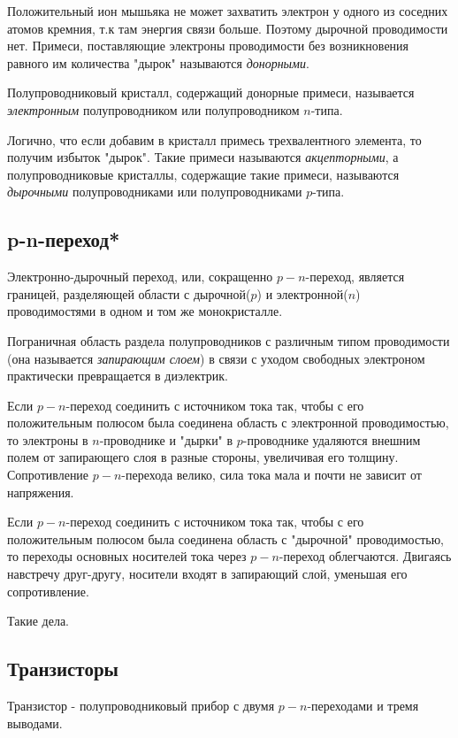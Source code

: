 \documentclass[12pt, a4paper]{article}
\begin{document}
Положительный ион мышьяка не может захватить электрон у одного из соседних атомов кремния, т.к там энергия связи больше. Поэтому дырочной проводимости нет. Примеси, поставляющие электроны проводимости без возникновения равного им количества "дырок" называются \textit{донорными}.

Полупроводниковый кристалл, содержащий донорные примеси, называется \textit{электронным} полупроводником или полупроводником $n$-типа.

Логично, что если добавим в кристалл примесь трехвалентного элемента, то получим избыток "дырок". Такие примеси называются \textit{акцепторными}, а полупроводниковые кристаллы, содержащие такие примеси, называются \textit{дырочными} полупроводниками или полупроводниками $p$-типа.

\subsection{p-n-переход*}
Электронно-дырочный переход, или, сокращенно $p-n$-переход, является границей, разделяющей области с дырочной($p$) и электронной($n$) проводимостями в одном и том же монокристалле.

Пограничная область раздела полупроводников с различным типом проводимости (она называется \textit{запирающим слоем}) в связи с уходом свободных электроном практически превращается в диэлектрик.

Если $p-n$-переход соединить с источником тока так, чтобы с его положительным полюсом была соединена область с электронной проводимостью, то электроны в $n$-проводнике и "дырки" в $p$-проводнике удаляются внешним полем от запирающего слоя в разные стороны, увеличивая его толщину. Сопротивление $p-n$-перехода велико, сила тока мала и почти не зависит от напряжения.

Если $p-n$-переход соединить с источником тока так, чтобы с его положительным полюсом была соединена область с "дырочной" проводимостью, то переходы основных носителей тока через $p-n$-переход облегчаются. Двигаясь навстречу друг-другу, носители входят в запирающий слой, уменьшая его сопротивление.

Такие дела.

\subsection{Транзисторы}
Транзистор - полупроводниковый прибор с двумя $p-n$-переходами и тремя выводами.
\end{document}
